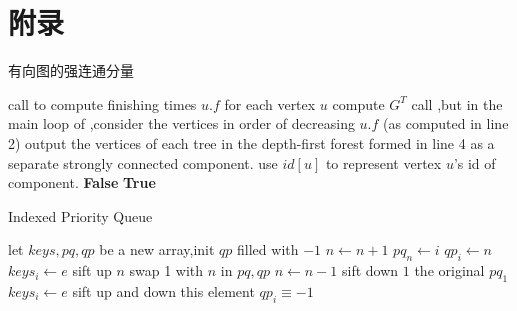 \documentclass[UTF8,a4paper]{ctexart}
\begin{document}
\section{附录}
\begin{algorithm}
    \caption{有向图的强连通分量}\label{scc}
    \begin{algorithmic}[1] %
        \State call  to compute finishing times {$u.f$} for each vertex {$u$}
        \State compute {$G^T$}
        \State call ,but in the main loop of ,consider the vertices in order of decreasing {$u.f$} (as computed in line 2)
        \State output the vertices of each tree in the depth-first forest formed in line 4 as a separate strongly connected component. use $id[u]$ to represent vertex $u$'s id of component.
        \EndFunction
        \State
        \State {}
        \EndFunction
        \State
        \State {}
        \EndFunction
        \State
        \State \Return \textbf{False}
        \EndIf
        \EndFor
        \State \Return \textbf{True}
        \EndFunction
    \end{algorithmic}
\end{algorithm}

\begin{algorithm}
    \caption{Indexed Priority Queue}\label{algoindexedpq}
    \begin{algorithmic}[1] %
        \State let $keys,pq,qp$ be a new array,init $qp$ filled with $-1$
        \EndFunction
        \State
        \State $n\gets n+1$
        \State $pq_n \gets i$
        \State $qp_i \gets n$
        \State $keys_i \gets e$
        \State sift up $n$
        \EndFunction
        \State
        \State {}
        \EndFunction
        \State
        \State swap 1 with $n$ in $pq,qp$
        \State $n\gets n - 1$
        \State sift down $1$
        \State \Return the original $pq_1$
        \EndFunction
        \State
        \State $keys_i\gets e$
        \State sift up and down this element
        \EndFunction
        \State
        \State \Return $qp_i\equiv -1$
        \EndFunction
    \end{algorithmic}
\end{algorithm}
\end{document}
